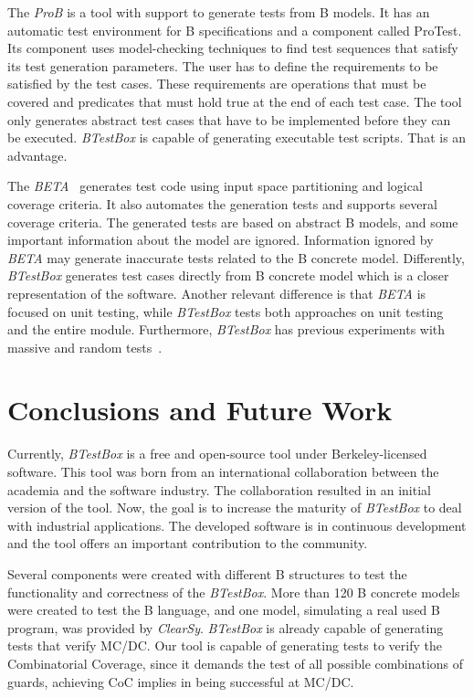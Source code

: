 \documentclass[runningheads]{llncs}
\begin{document}
The \textit{ProB} is a tool with support to generate tests from B models. It has an automatic test environment for B specifications and a component called ProTest.
Its component uses model-checking techniques to find test sequences that satisfy its test generation parameters. The user has to define the requirements to be satisfied by the test cases. These requirements are operations that must be covered and predicates that must hold true at the end of each test case. The tool only generates abstract test cases that have to be implemented before they can be executed. \textit{BTestBox} is capable of generating executable test scripts. That is an advantage. 


The \textit{BETA}~\cite{ernesto_thesis:2016} generates test code using input space partitioning and logical coverage criteria. It also automates the generation tests and supports several coverage criteria. The generated tests are based on abstract B models, and some important information about the model are ignored.
Information ignored by \textit{BETA} may generate inaccurate tests related to the B concrete model. Differently, \textit{BTestBox} generates test cases directly from B concrete model which is a closer representation of the software.
Another relevant difference is that \textit{BETA} is focused on unit testing, while \textit{BTestBox} tests both approaches on unit testing and the entire module. Furthermore, \textit{BTestBox} has previous experiments with massive and random tests~\cite{deharbebtestbox}.

\section{Conclusions and Future Work} \label{sec:Conclusion}


Currently, \textit{BTestBox} is a free and open-source tool under Berkeley-licensed software.
This tool was born from an international collaboration between the academia and the software industry. The collaboration resulted in an initial version of the tool. Now, the goal is to increase the maturity of \textit{BTestBox} to deal with industrial applications.
The developed software is in continuous development and the tool offers an important contribution to the community.

Several components were created with different B structures to test the functionality and correctness of the \textit{BTestBox}. More than 120 B concrete models were created to test the B language, and one model, simulating a real used B program, was provided by \textit{ClearSy}. \textit{BTestBox} is already capable of generating tests that verify MC/DC. Our tool is capable of generating tests to verify the Combinatorial Coverage, since it demands the test of all possible combinations of guards, achieving CoC implies in being successful at MC/DC. %
\end{document}
